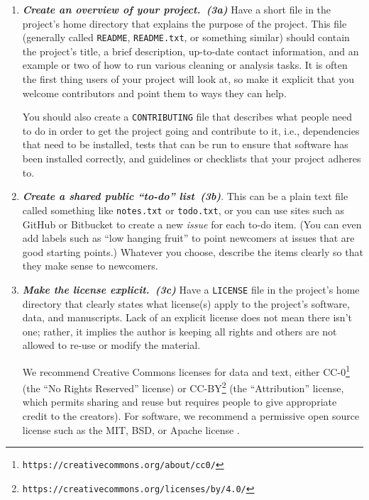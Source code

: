 \documentclass[10pt,letterpaper]{article}
\newcommand{\withurl}[2]{{#1}\footnote{{\texttt{#2}}}}
\newcommand{\practice}[2]{\textbf{\emph{{#2}~({#1})}}}
\begin{document}
\begin{enumerate}

\item
  \practice{3a}{Create an overview of your project.}  Have a short
  file in the project's home directory that explains the
  purpose of the project.  This file (generally called
  \texttt{README}, \texttt{README.txt}, or something similar) should
  contain the project's title, a brief description, up-to-date contact
  information, and
  an example or two of how to run various cleaning or analysis tasks.  It is often
  the first thing users of your project will look at, so make it
  explicit that you welcome contributors and point them to ways they
  can help.

  You should also create a \texttt{CONTRIBUTING} file that describes
  what people need to do in order to get the project going and
  contribute to it, i.e., dependencies that need to be installed,
  tests that can be run to ensure that software has been installed
  correctly, and guidelines or checklists that your project adheres
  to.

\item
  \practice{3b}{Create a shared public ``to-do'' list}.  This can be a
  plain text file called something like \texttt{notes.txt} or
  \texttt{todo.txt}, or you can use sites such as GitHub or Bitbucket
  to create a new \emph{issue} for each to-do item. (You can even add
  labels such as ``low hanging fruit'' to point newcomers at issues
  that are good starting points.)  Whatever you choose, describe the
  items clearly so that they make sense to newcomers.

\item
  \practice{3c}{Make the license explicit.}  Have a \texttt{LICENSE} file
  in the project's home directory that clearly states what license(s)
  apply to the project's software, data, and manuscripts. Lack of an
  explicit license does not mean there isn't one; rather, it implies
  the author is keeping all rights and others are not allowed to
  re-use or modify the material.

  We recommend Creative Commons licenses for data and text, either
  \withurl{CC-0}{https://creativecommons.org/about/cc0/} (the ``No
  Rights Reserved'' license) or
  \withurl{CC-BY}{https://creativecommons.org/licenses/by/4.0/} (the
  ``Attribution'' license, which permits sharing and reuse but requires people
  to give appropriate credit to the creators).  For software, we
  recommend a permissive open source license such as the MIT, BSD, or Apache
  license \cite{laurent2004}.


\end{enumerate}
\end{document}
